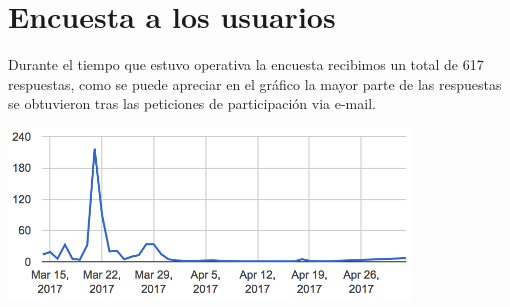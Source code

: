 \section{Encuesta a los usuarios}

Durante el tiempo que estuvo operativa la encuesta recibimos un total de 617 respuestas, como se puede apreciar en el gráfico la mayor parte de las respuestas se obtuvieron tras las peticiones de participación via e-mail.

    \includegraphics[width=0.8\textwidth]{../charts/00_fecha}
 	

